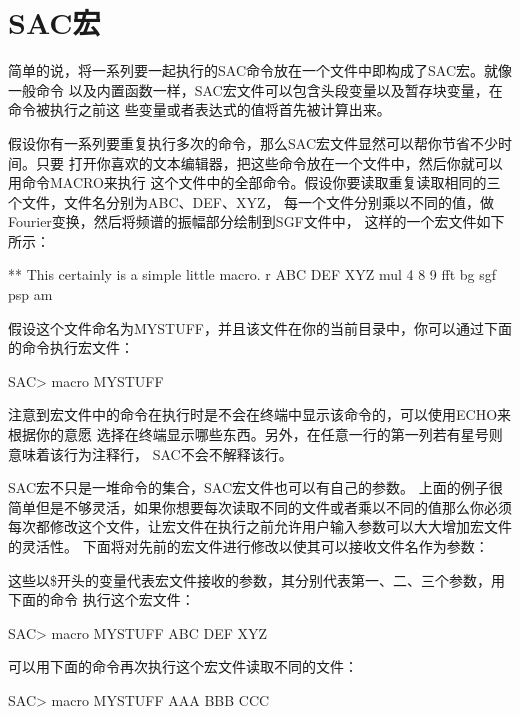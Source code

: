 \section{SAC宏\protect\footnotemark}
\label{sec:macros}
简单的说，将一系列要一起执行的SAC命令放在一个文件中即构成了SAC宏。就像一般命令
以及内置函数一样，SAC宏文件可以包含头段变量以及暂存块变量，在命令被执行之前这
些变量或者表达式的值将首先被计算出来。

假设你有一系列要重复执行多次的命令，那么SAC宏文件显然可以帮你节省不少时间。只要
打开你喜欢的文本编辑器，把这些命令放在一个文件中，然后你就可以用命令MACRO来执行
这个文件中的全部命令。假设你要读取重复读取相同的三个文件，文件名分别为ABC、DEF、XYZ，
每一个文件分别乘以不同的值，做Fourier变换，然后将频谱的振幅部分绘制到SGF文件中，
这样的一个宏文件如下所示：
\begin{SACCode}
  ** This certainly is a simple little macro.
  r ABC DEF XYZ
  mul 4 8 9
  fft
  bg sgf
  psp am
\end{SACCode}

假设这个文件命名为MYSTUFF，并且该文件在你的当前目录中，你可以通过下面的命令执行宏文件：
\begin{SACCode}
SAC> macro MYSTUFF
\end{SACCode}
注意到宏文件中的命令在执行时是不会在终端中显示该命令的，可以使用ECHO来根据你的意愿
选择在终端显示哪些东西。另外，在任意一行的第一列若有星号则意味着该行为注释行，
SAC不会不解释该行。

SAC宏不只是一堆命令的集合，SAC宏文件也可以有自己的参数。
上面的例子很简单但是不够灵活，如果你想要每次读取不同的文件或者乘以不同的值那么你必须
每次都修改这个文件，让宏文件在执行之前允许用户输入参数可以大大增加宏文件的灵活性。
下面将对先前的宏文件进行修改以使其可以接收文件名作为参数：
这些以\$开头的变量代表宏文件接收的参数，其分别代表第一、二、三个参数，用下面的命令
执行这个宏文件：
\begin{SACCode}
SAC> macro MYSTUFF ABC DEF XYZ 
\end{SACCode}
可以用下面的命令再次执行这个宏文件读取不同的文件：
\begin{SACCode}
SAC> macro MYSTUFF AAA BBB CCC
\end{SACCode}

